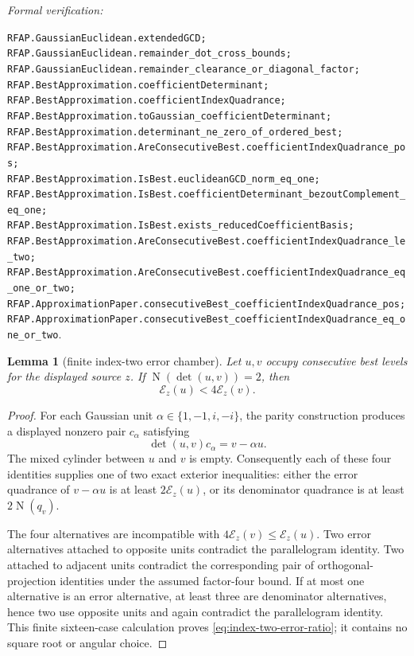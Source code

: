 \documentclass[11pt]{article}
\newtheorem{lemma}[lemma]{Lemma}
\newcommand{\Norm}[1]{\operatorname{N}\!\left(#1\right)}
\newcommand{\leanref}[1]{\par\smallskip\noindent
  \emph{Formal verification:}\par\nobreak
  {\raggedright\nolinkurl{#1}.\par}}
\begin{document}
\leanref{RFAP.GaussianEuclidean.extendedGCD;
RFAP.GaussianEuclidean.remainder_dot_cross_bounds;
RFAP.GaussianEuclidean.remainder_clearance_or_diagonal_factor;
RFAP.BestApproximation.coefficientDeterminant;
RFAP.BestApproximation.coefficientIndexQuadrance;
RFAP.BestApproximation.toGaussian_coefficientDeterminant;
RFAP.BestApproximation.determinant_ne_zero_of_ordered_best;
RFAP.BestApproximation.AreConsecutiveBest.coefficientIndexQuadrance_pos;
RFAP.BestApproximation.IsBest.euclideanGCD_norm_eq_one;
RFAP.BestApproximation.IsBest.coefficientDeterminant_bezoutComplement_eq_one;
RFAP.BestApproximation.IsBest.exists_reducedCoefficientBasis;
RFAP.BestApproximation.AreConsecutiveBest.coefficientIndexQuadrance_le_two;
RFAP.BestApproximation.AreConsecutiveBest.coefficientIndexQuadrance_eq_one_or_two;
RFAP.ApproximationPaper.consecutiveBest_coefficientIndexQuadrance_pos;
RFAP.ApproximationPaper.consecutiveBest_coefficientIndexQuadrance_eq_one_or_two}

\begin{lemma}[finite index-two error chamber]
\label{lem:index-two-error-chamber}
Let $u,v$ occupy consecutive best levels for the displayed source $z$.  If
$\Norm{\det(u,v)}=2$, then
\begin{equation}
\label{eq:index-two-error-ratio}
                  \mathcal E_z(u)<4\mathcal E_z(v).
\end{equation}
\end{lemma}

\begin{proof}
For each Gaussian unit $\alpha\in\{1,-1,i,-i\}$, the parity construction
produces a displayed nonzero pair $c_\alpha$ satisfying
\[
       \det(u,v)c_\alpha=v-\alpha u.
\]
The mixed cylinder between $u$ and $v$ is empty.  Consequently each of these
four identities supplies one of two exact exterior inequalities: either the
error quadrance of $v-\alpha u$ is at least
$2\mathcal E_z(u)$, or its denominator quadrance is at least
$2\Norm{q_v}$.

The four alternatives are incompatible with
$4\mathcal E_z(v)\le\mathcal E_z(u)$.  Two error alternatives attached to
opposite units contradict the parallelogram identity.  Two attached to
adjacent units contradict the corresponding pair of orthogonal-projection
identities under the assumed factor-four bound.  If at most one alternative
is an error alternative, at least three are denominator alternatives, hence
two use opposite units and again contradict the parallelogram identity.
This finite sixteen-case calculation proves
\eqref{eq:index-two-error-ratio}; it contains no square root or angular
choice.
\end{proof}
\end{document}
